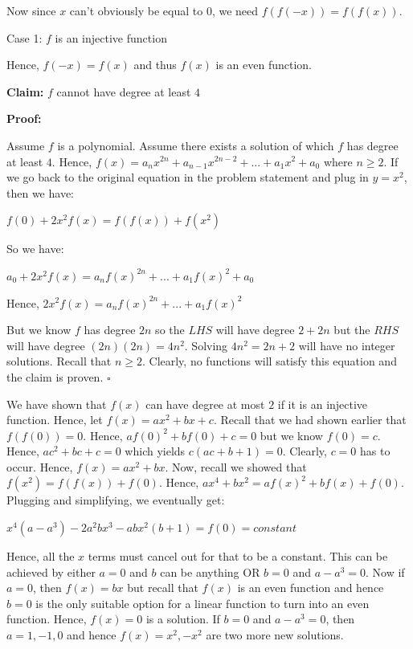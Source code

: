 \begin{enumerate}
 Now since $x$ can't obviously be equal to $0$, we need $f(f(-x)) = f(f(x))$.

 Case 1: $f$ is an injective function

 Hence, $f(-x) = f(x)$ and thus $f(x)$ is an even function.

 \textbf{Claim:} $f$ cannot have degree at least $4$

 \textbf{Proof:}

 Assume $f$ is a polynomial. Assume there exists a solution of which $f$ has degree at least $4$. Hence, $f(x) = a_n x^{2n} + a_{n - 1} x^{2n - 2} + ... + a_1 x^{2} + a_0$ where $n \geq 2$. If we go back to the original equation in the problem statement and plug in $y = x^{2}$, then we have: 

 $f(0) + 2x^{2} f(x) = f(f(x)) + f(x^{2})$

 So we have:

 $a_0 + 2x^{2}f(x) = a_n f(x)^{2n} + ... + a_1 f(x)^{2} + a_0$

 Hence, $2x^{2} f(x) = a_n f(x)^{2n} + ... + a_1 f(x)^{2}$

 But we know $f$ has degree $2n$ so the $LHS$ will have degree $2 + 2n$ but the $RHS$ will have degree $(2n)(2n) = 4n^{2}$. Solving $4n^{2} = 2n + 2$ will have no integer solutions. Recall that $n \geq 2$. Clearly, no functions will satisfy this equation and the claim is proven. $\square$

 We have shown that $f(x)$ can have degree at most $2$ if it is an injective function. Hence, let $f(x) = ax^{2} + bx + c$. Recall that we had shown earlier that $f(f(0)) = 0$. Hence, $a f(0)^{2} + b f(0) + c = 0$ but we know $f(0) = c$. Hence, $ac^{2} + bc + c = 0$ which yields $c(ac + b + 1) = 0$. Clearly, $c = 0$ has to occur. Hence, $f(x) = ax^{2} + bx$. Now, recall we showed that $f(x^{2}) = f(f(x)) + f(0)$. Hence, $ax^{4} + bx^{2} = af(x)^{2} + bf(x) + f(0)$. Plugging and simplifying, we eventually get:

 $x^{4} (a - a^{3}) - 2a^{2} b x^{3} - abx^{2} (b + 1) = f(0) = constant$

 Hence, all the $x$ terms must cancel out for that to be a constant. This can be achieved by either $a = 0$ and $b$ can be anything OR $b = 0$ and $a - a^{3} = 0$. Now if $a = 0$, then $f(x) = bx$ but recall that $f(x)$ is an even function and hence $b = 0$ is the only suitable option for a linear function to turn into an even function. Hence, $f(x) = 0$ is a solution. If $b = 0$ and $a - a^{3} = 0$, then $a = 1, -1, 0$ and hence $f(x) = x^{2}, -x^{2}$ are two more new solutions.


\end{enumerate}
